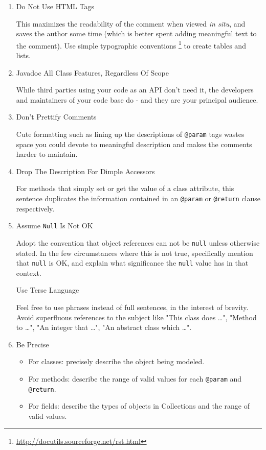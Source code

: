 \documentclass{article}
\begin{document}
\begin{enumerate}
\item Do Not Use HTML Tags
\label{sec:orgheadline257}

This maximizes the readability of the comment when viewed \emph{in situ}, and
saves the author some time (which is better spent adding meaningful text
to the comment). Use simple typographic conventions \footnote{\url{http://docutils.sourceforge.net/rst.html}} to create
tables and lists.

\item Javadoc All Class Features, Regardless Of Scope
\label{sec:orgheadline258}

While third parties using your code as an API don't need it, the
developers and maintainers of your code base do - and they are your
principal audience.

\item Don't Prettify Comments
\label{sec:orgheadline259}

Cute formatting such as lining up the descriptions of \texttt{@param} tags
wastes space you could devote to meaningful description and makes the
comments harder to maintain.

\item Drop The Description For Dimple Accessors
\label{sec:orgheadline260}

For methods that simply set or get the value of a class attribute, this
sentence duplicates the information contained in an \texttt{@param} or
\texttt{@return} clause respectively.

\item Assume \texttt{Null} Is Not OK
\label{sec:orgheadline261}

Adopt the convention that object references can not be \texttt{null} unless
otherwise stated. In the few circumstances where this is not true,
specifically mention that \texttt{null} is OK, and explain what significance
the \texttt{null} value has in that context.

Use Terse Language

Feel free to use phrases instead of full sentences, in the interest of
brevity. Avoid superfluous references to the subject like "This class
does \ldots{}", "Method to \ldots{}", "An integer that \ldots{}", "An abstract class
which \ldots{}".

\item Be Precise
\label{sec:orgheadline262}

\begin{itemize}
\item For classes: precisely describe the object being modeled.
\item For methods: describe the range of valid values for each \texttt{@param} and
\texttt{@return}.
\item For fields: describe the types of objects in Collections and the
range of valid values.
\end{itemize}
\end{enumerate}
\end{document}
